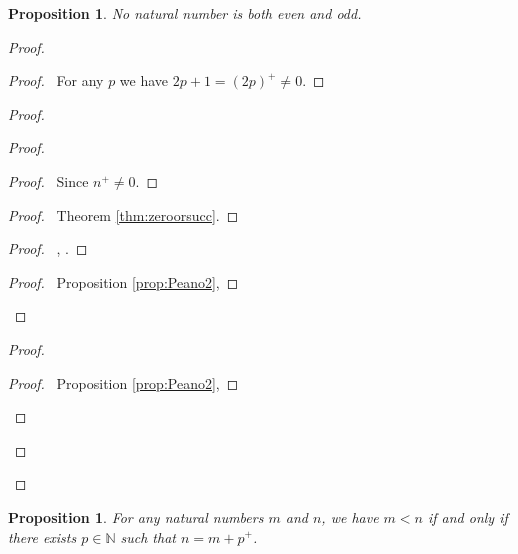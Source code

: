 \documentclass{book}
\let\qed\relax
\newtheorem{prop}[ax]{Proposition}
\theoremstyle{definition}
\begin{document}
\begin{prop}
No natural number is both even and odd.
\end{prop}

\begin{proof}
\pf
{}
\begin{proof}
	\pf\ For any $p$ we have $2p+1 = (2p)^+ \neq 0$.
\end{proof}
\begin{proof}
	\begin{proof}
		\begin{proof}
			\pf\ Since $n^+ \neq 0$.
		\end{proof}
		\begin{proof}
			\pf\ Theorem \ref{thm:zeroorsucc}.
		\end{proof}
		\begin{proof}
			\pf\ , .
		\end{proof}
		\begin{proof}
			\pf\ Proposition \ref{prop:Peano2}, 
		\end{proof}
	\end{proof}
	\begin{proof}
		\begin{proof}
			\pf\ Proposition \ref{prop:Peano2}, 
		\end{proof}
	\end{proof}
\end{proof}
\qed
\end{proof}

\begin{prop}
For any natural numbers $m$ and $n$, we have $m < n$ if and only if there exists $p \in \mathbb{N}$ such that $n = m + p^+$.
\end{prop}
\end{document}

